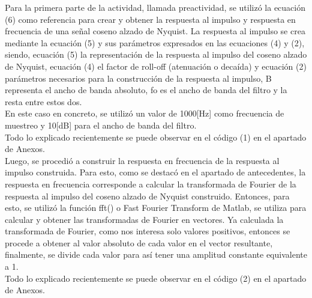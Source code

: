 \documentclass[lettersize,journal]{IEEEtran}
\begin{document}
Para la primera parte de la actividad, llamada preactividad, se utilizó la ecuación (6) como referencia para crear y obtener la respuesta al impulso y respuesta en frecuencia de una señal coseno alzado de Nyquist. La respuesta al impulso se crea mediante la ecuación (5) y sus parámetros expresados en las ecuaciones (4) y (2), siendo, ecuación (5) la representación de la respuesta al impulso del coseno alzado de Nyquist, ecuación (4) el factor de roll-off (atenuación o decaída) y ecuación (2) parámetros necesarios para la construcción de la respuesta al impulso, B representa el ancho de banda absoluto, fo es el ancho de banda del filtro y la resta entre estos dos.\\
En este caso en concreto, se utilizó un valor de 1000[Hz] como frecuencia de muestreo y 10[dB] para el ancho de banda del filtro.
\\
Todo lo explicado recientemente se puede observar en el código (1) en el apartado de Anexos.\\

Luego, se procedió a construir la respuesta en frecuencia de la respuesta al impulso construida. Para esto, como se destacó en el apartado de antecedentes, la respuesta en frecuencia corresponde a calcular la transformada de Fourier de la respuesta al impulso del coseno alzado de Nyquist construido. Entonces, para esto, se utilizó la función fft() o Fast Fourier Transform de Matlab, se utiliza para calcular y obtener las transformadas de Fourier en vectores. Ya calculada la transformada de Fourier, como nos interesa solo valores positivos, entonces se procede a obtener al valor absoluto de cada valor en el vector resultante, finalmente, se divide cada valor para así tener una amplitud constante equivalente a 1.
\\
Todo lo explicado recientemente se puede observar en el código (2) en el apartado de Anexos.\\
\end{document}
